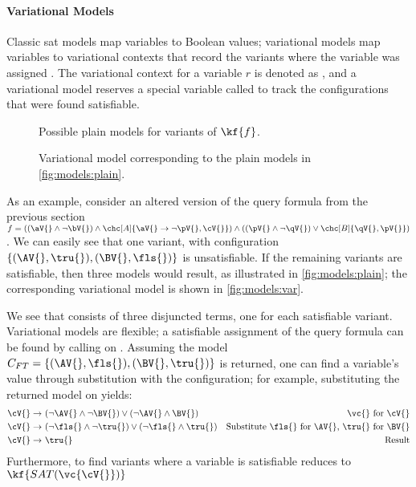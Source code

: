 \paragraph{Variational Models}%
\label{ssec:vmodels}
%
Classic \ac{sat} models map variables to Boolean values; variational models map
variables to variational contexts that record the variants where the variable
was assigned \tru{}. The variational context for a variable $r$ is denoted as
, and a variational model reserves a special variable called \SatVar{} to
track the configurations that were found satisfiable.
%
\begin{figure}[h]
  \centering
  
  \caption{Possible plain models for variants of $\kf{f}$.}%
  \label{fig:models:plain}
\end{figure}
\begin{figure}[h]
  \centering
  
  \caption{Variational model corresponding to the plain models in
    \autoref{fig:models:plain}.}%
  \label{fig:models:var}
\end{figure}
%
As an example, consider an altered version of the query formula from the
previous section $f = ((\aV{} \wedge \neg \bV{}) \wedge \chc[A]{\aV{}
  \rightarrow \neg \pV{}, \cV{}}) \wedge ((\pV{} \wedge \neg \qV{}) \vee
\chc[B]{\qV{}, \pV{}})$. We can easily see that one variant, with configuration
$\{(\AV{},\tru{}), (\BV{},\fls{})\}$ is unsatisfiable. If the remaining variants
are satisfiable, then three models would result, as illustrated in
\autoref{fig:models:plain}; the corresponding variational model is shown in
\autoref{fig:models:var}.

We see that \Satfmf{} consists of three disjuncted terms, one for each
satisfiable variant. Variational models are flexible; a satisfiable assignment
of the query formula can be found by calling \sat{} on \Satfmf{}. Assuming the
model $C_{FT} = \{(\AV{}, \fls{}), (\BV{}, \tru{})\}$ is returned, one can find
a variable's value through substitution with the configuration; for example,
substituting the returned model on  yields:
%
\begin{align*}
  \cV{} \rightarrow\ & (\neg \AV{} \wedge \neg \BV{}) \vee (\neg \AV{} \wedge \BV{}) & \text{\vc{} for \cV{}} \\
  \cV{} \rightarrow\ & (\neg \fls{} \wedge \neg \tru{}) \vee (\neg \fls{} \wedge \tru{}) & \text{Substitute \fls{} for \AV{}, \tru{} for \BV{}} \\
  \cV{} \rightarrow\ & \tru{} & \text{Result}
\end{align*}%
%
Furthermore, to find variants where a variable \cV{} is satisfiable reduces to
$\kf{SAT(\vc{\cV{}})}$

